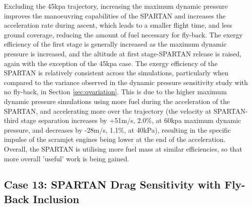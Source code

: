 Excluding the 45kpa trajectory, increasing the maximum dynamic pressure improves the manoeuvring capabilities of the SPARTAN and increases the acceleration rate during ascent, which leads to a smaller flight time, and less ground coverage, reducing the amount of fuel necessary for fly-back. 
The exergy efficiency of the first stage is generally increased as the maximum dynamic pressure is increased, and the altitude at first stage-SPARTAN release is raised, again with the exception of the 45kpa case. 
The exergy efficiency of the SPARTAN is relatively consistent across the simulations, particularly when compared to the variance observed in the dynamic pressure sensitivity study with no fly-back, in Section \ref{sec:qvariation}.
This is due to the higher maximum dynamic pressure simulations using more fuel during the acceleration of the SPARTAN, and accelerating more over the trajectory (the velocity at SPARTAN-third stage separation increases by +51m/s, 2.0\%, at 60kpa maximum dynamic pressure, and decreases by -28m/s, 1.1\%, at 40kPa), resulting in the specific impulse of the scramjet engines being lower at the end of the acceleration. Overall, the SPARTAN is utilising more fuel mass at similar efficiencies, so that more overall 'useful' work is being gained. 


\subsection{Case 13: SPARTAN Drag Sensitivity with Fly-Back Inclusion}


